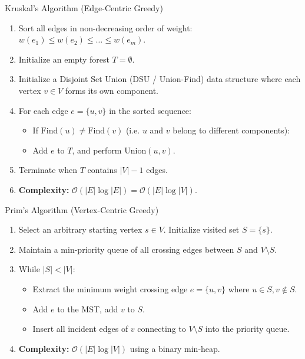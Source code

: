 \begin{definitionbox}{Kruskal's Algorithm (Edge-Centric Greedy)}
\begin{enumerate}
    \item Sort all edges in non-decreasing order of weight: $w(e_1) \le w(e_2) \le \dots \le w(e_m)$.
    \item Initialize an empty forest $T = \emptyset$.
    \item Initialize a Disjoint Set Union (DSU / Union-Find) data structure where each vertex $v \in V$ forms its own component.
    \item For each edge $e = \{u, v\}$ in the sorted sequence:
    \begin{itemize}
        \item If $\text{Find}(u) \neq \text{Find}(v)$ (i.e. $u$ and $v$ belong to different components):
        \item Add $e$ to $T$, and perform $\text{Union}(u, v)$.
    \end{itemize}
    \item Terminate when $T$ contains $|V| - 1$ edges.
    \item \textbf{Complexity:} $\mathcal{O}(|E| \log |E|) = \mathcal{O}(|E| \log |V|)$.
\end{enumerate}
\end{definitionbox}

\begin{definitionbox}{Prim's Algorithm (Vertex-Centric Greedy)}
\begin{enumerate}
    \item Select an arbitrary starting vertex $s \in V$. Initialize visited set $S = \{s\}$.
    \item Maintain a min-priority queue of all crossing edges between $S$ and $V \setminus S$.
    \item While $|S| < |V|$:
    \begin{itemize}
        \item Extract the minimum weight crossing edge $e = \{u, v\}$ where $u \in S, v \notin S$.
        \item Add $e$ to the MST, add $v$ to $S$.
        \item Insert all incident edges of $v$ connecting to $V \setminus S$ into the priority queue.
    \end{itemize}
    \item \textbf{Complexity:} $\mathcal{O}(|E| \log |V|)$ using a binary min-heap.
\end{enumerate}
\end{definitionbox}

